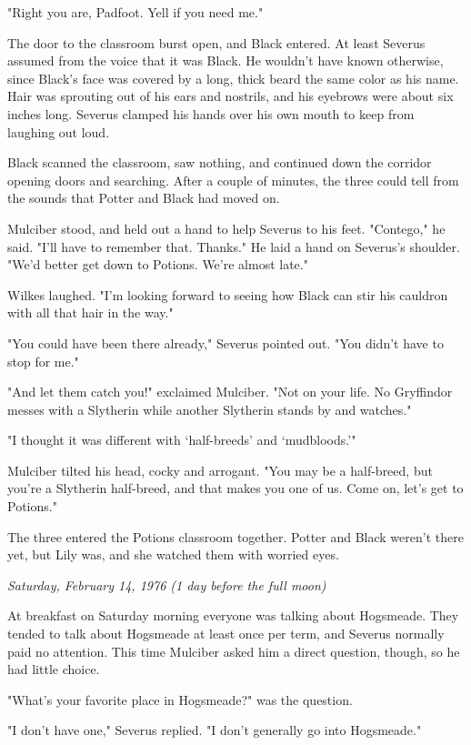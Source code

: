 \documentclass[a4paper,11pt]{article}
\begin{document}
"Right you are, Padfoot. Yell if you need me."

The door to the classroom burst open, and Black entered. At least Severus assumed from the voice that it was Black. He wouldn't have known otherwise, since Black's face was covered by a long, thick beard the same color as his name. Hair was sprouting out of his ears and nostrils, and his eyebrows were about six inches long. Severus clamped his hands over his own mouth to keep from laughing out loud.

Black scanned the classroom, saw nothing, and continued down the corridor opening doors and searching. After a couple of minutes, the three could tell from the sounds that Potter and Black had moved on.

Mulciber stood, and held out a hand to help Severus to his feet. "Contego," he said. "I'll have to remember that. Thanks." He laid a hand on Severus's shoulder. "We'd better get down to Potions. We're almost late."

Wilkes laughed. "I'm looking forward to seeing how Black can stir his cauldron with all that hair in the way."

"You could have been there already," Severus pointed out. "You didn't have to stop for me."

"And let them catch you!" exclaimed Mulciber. "Not on your life. No Gryffindor messes with a Slytherin while another Slytherin stands by and watches."

"I thought it was different with `half-breeds' and `mudbloods.'"

Mulciber tilted his head, cocky and arrogant. "You may be a half-breed, but you're a Slytherin half-breed, and that makes you one of us. Come on, let's get to Potions."

The three entered the Potions classroom together. Potter and Black weren't there yet, but Lily was, and she watched them with worried eyes.

\emph{Saturday, February 14, 1976 (1 day before the full moon)}

At breakfast on Saturday morning everyone was talking about Hogsmeade. They tended to talk about Hogsmeade at least once per term, and Severus normally paid no attention. This time Mulciber asked him a direct question, though, so he had little choice.

"What's your favorite place in Hogsmeade?" was the question.

"I don't have one," Severus replied. "I don't generally go into Hogsmeade."
\end{document}
